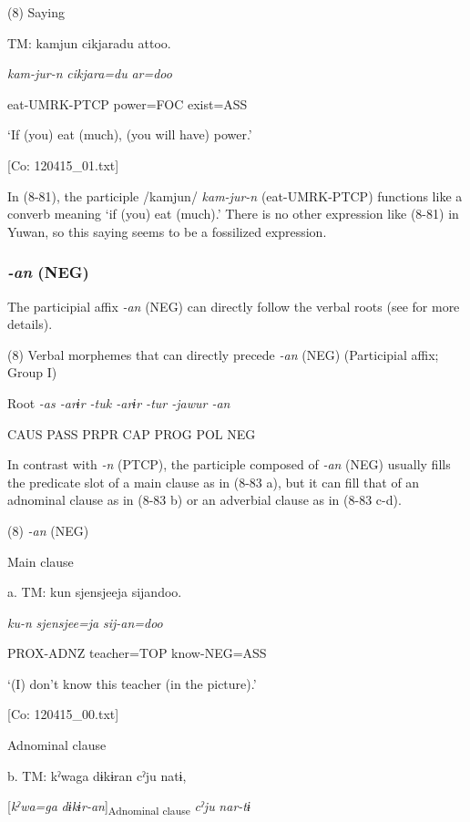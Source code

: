 (8)  Saying

  TM:  kamjun  cikjaradu  attoo.

    \textit{kam-jur-n}  \textit{cikjara=du}  \textit{ar=doo}

    eat-UMRK-PTCP  power=FOC  exist=ASS

    ‘If (you) eat (much), (you will have) power.’

    [Co: 120415\_01.txt]

In (8-81), the participle /kamjun/ \textit{kam-jur-n} (eat-UMRK-PTCP) functions like a converb meaning ‘if (you) eat (much).’ There is no other expression like (8-81) in Yuwan, so this saying seems to be a fossilized expression.

\subsubsection{\textit{{}-an} (NEG)}

The participial affix \textit{{}-an} (NEG) can directly follow the verbal roots (see  for more details).

(8)  Verbal morphemes that can directly precede \textit{{}-an} (NEG) (Participial affix; Group I)

  Root  \textit{{}-as  {}-arɨr  {}-tuk  {}-arɨr  {}-tur  {}-jawur  {}-an}

    CAUS  PASS  PRPR  CAP  PROG  POL  NEG

In contrast with \textit{{}-n} (PTCP), the participle composed of \textit{{}-an} (NEG) usually fills the predicate slot of a main clause as in (8-83 a), but it can fill that of an adnominal clause as in (8-83 b) or an adverbial clause as in (8-83 c-d).

(8)  \textit{{}-an} (NEG)

  Main clause

  a.  TM:  kun  {\textbar}sjensjee{\textbar}ja  sijandoo.

      \textit{ku-n}  \textit{sjensjee=ja}  \textit{sij-an=doo}

      PROX-ADNZ  teacher=TOP  know-NEG=ASS

      ‘(I) don’t know this teacher (in the picture).’

      [Co: 120415\_00.txt]

  Adnominal clause

  b.  TM:  kˀwaga  dɨkɨran  cˀju  natɨ,

      [\textit{kˀwa=ga}  \textit{dɨkɨr-an}]\textsubscript{Adnominal clause}  \textit{cˀju}  \textit{nar-tɨ}

